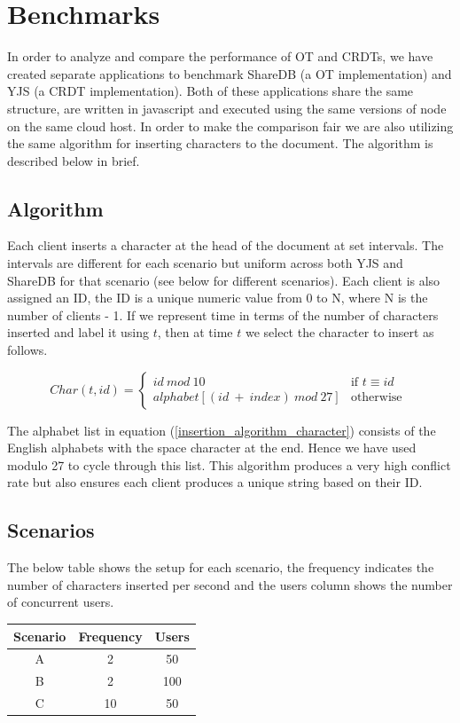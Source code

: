 \documentclass[9pt, titlepage]{article}
\begin{document}
  \section*{Benchmarks}
  In order to analyze and compare the performance of OT and CRDTs, we have created separate applications to benchmark ShareDB (a OT implementation) and YJS (a CRDT implementation).
  Both of these applications share the same structure, are written in javascript and executed using the same versions of node on the same cloud host.
  In order to make the comparison fair we are also utilizing the same algorithm for inserting characters to the document. The algorithm is described below in brief.

  \subsection{Algorithm}
  Each client inserts a character at the head of the document at set intervals. The intervals are different for each scenario but uniform across both YJS and ShareDB for that scenario (see below for different scenarios).
  Each client is also assigned an ID, the ID is a unique numeric value from 0 to N, where N is the number of clients - 1.
  If we represent time in terms of the number of characters inserted and label it using \(t\), then at time \(t\) we select the character to insert as follows.
  
  \begin{equation} \label{insertion_algorithm_character}
    Char(t, id) =
    \left\{
	    \begin{array}{ll}
		    id\ mod\ 10 & \mbox{if } t \equiv id \\
        alphabet[(id\ +\ index)\ mod\ 27] & \mbox{otherwise }
	    \end{array}
    \right.
  \end{equation}

  The alphabet list in equation (\ref{insertion_algorithm_character}) consists of the English alphabets with the space character at the end.
  Hence we have used modulo 27 to cycle through this list. This algorithm produces a very high conflict rate but also ensures each client 
  produces a unique string based on their ID.

  \subsection{Scenarios}
  The below table shows the setup for each scenario, the frequency indicates the number of characters 
  inserted per second and the users column shows the number of concurrent users.\\
  \begin{table}
    \centering
    \begin{tabular}{||c c c||} 
      \hline
      Scenario & Frequency & Users \\ [0.5ex] 
      \hline\hline
      A & 2 & 50 \\ 
      \hline
      B & 2 & 100 \\
      \hline
      C & 10 & 50 \\
      \hline
    \end{tabular}
  \end{table}
\end{document}
